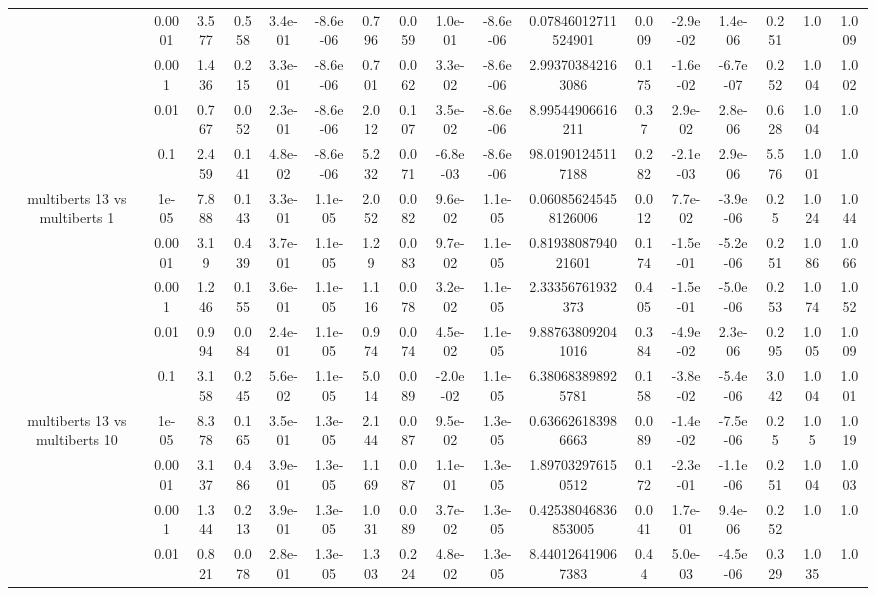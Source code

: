 \begin{tabular}{|c|c|c|c|c|c|c|c|c|c|c|c|c|c|c|c|c|}
 & 0.0001 & 3.577 & 0.558 & 3.4e-01 & -8.6e-06 & 0.796 & 0.059 & 1.0e-01 & -8.6e-06 & 0.07846012711524901 & 0.009 & -2.9e-02 & 1.4e-06 & 0.251 & 1.0 & 1.009 \\
 & 0.001 & 1.436 & 0.215 & 3.3e-01 & -8.6e-06 & 0.701 & 0.062 & 3.3e-02 & -8.6e-06 & 2.993703842163086 & 0.175 & -1.6e-02 & -6.7e-07 & 0.252 & 1.004 & 1.002 \\
 & 0.01 & 0.767 & 0.052 & 2.3e-01 & -8.6e-06 & 2.012 & 0.107 & 3.5e-02 & -8.6e-06 & 8.99544906616211 & 0.37 & 2.9e-02 & 2.8e-06 & 0.628 & 1.004 & 1.0 \\
 & 0.1 & 2.459 & 0.141 & 4.8e-02 & -8.6e-06 & 5.232 & 0.071 & -6.8e-03 & -8.6e-06 & 98.01901245117188 & 0.282 & -2.1e-03 & 2.9e-06 & 5.576 & 1.001 & 1.0 \\
\hline
\multirow{5}{*}{multiberts 13 vs multiberts 1} & 1e-05 & 7.888 & 0.143 & 3.3e-01 & 1.1e-05 & 2.052 & 0.082 & 9.6e-02 & 1.1e-05 & 0.060856245458126006 & 0.012 & 7.7e-02 & -3.9e-06 & 0.25 & 1.024 & 1.044 \\
 & 0.0001 & 3.19 & 0.439 & 3.7e-01 & 1.1e-05 & 1.29 & 0.083 & 9.7e-02 & 1.1e-05 & 0.8193808794021601 & 0.174 & -1.5e-01 & -5.2e-06 & 0.251 & 1.086 & 1.066 \\
 & 0.001 & 1.246 & 0.155 & 3.6e-01 & 1.1e-05 & 1.116 & 0.078 & 3.2e-02 & 1.1e-05 & 2.33356761932373 & 0.405 & -1.5e-01 & -5.0e-06 & 0.253 & 1.074 & 1.052 \\
 & 0.01 & 0.994 & 0.084 & 2.4e-01 & 1.1e-05 & 0.974 & 0.074 & 4.5e-02 & 1.1e-05 & 9.887638092041016 & 0.384 & -4.9e-02 & 2.3e-06 & 0.295 & 1.005 & 1.009 \\
 & 0.1 & 3.158 & 0.245 & 5.6e-02 & 1.1e-05 & 5.014 & 0.089 & -2.0e-02 & 1.1e-05 & 6.380683898925781 & 0.158 & -3.8e-02 & -5.4e-06 & 3.042 & 1.004 & 1.001 \\
\hline
\multirow{5}{*}{multiberts 13 vs multiberts 10} & 1e-05 & 8.378 & 0.165 & 3.5e-01 & 1.3e-05 & 2.144 & 0.087 & 9.5e-02 & 1.3e-05 & 0.636626183986663 & 0.089 & -1.4e-02 & -7.5e-06 & 0.25 & 1.05 & 1.019 \\
 & 0.0001 & 3.137 & 0.486 & 3.9e-01 & 1.3e-05 & 1.169 & 0.087 & 1.1e-01 & 1.3e-05 & 1.897032976150512 & 0.172 & -2.3e-01 & -1.1e-06 & 0.251 & 1.004 & 1.003 \\
 & 0.001 & 1.344 & 0.213 & 3.9e-01 & 1.3e-05 & 1.031 & 0.089 & 3.7e-02 & 1.3e-05 & 0.42538046836853005 & 0.041 & 1.7e-01 & 9.4e-06 & 0.252 & 1.0 & 1.0 \\
 & 0.01 & 0.821 & 0.078 & 2.8e-01 & 1.3e-05 & 1.303 & 0.224 & 4.8e-02 & 1.3e-05 & 8.440126419067383 & 0.44 & 5.0e-03 & -4.5e-06 & 0.329 & 1.035 & 1.0 \\

\end{tabular}

